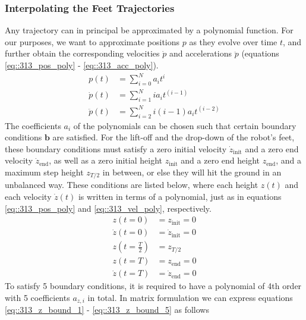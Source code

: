 \subsubsection{Interpolating the Feet Trajectories}
Any trajectory can in principal be approximated by a polynomial function. For our purposes, we want to approximate positions $p$ as they evolve over time $t$, and further obtain the corresponding velocities $\dot{p}$ and accelerations $\ddot{p}$ (equations \ref{eq::313_pos_poly} - \ref{eq::313_acc_poly}).  
\begin{align}
	p(t) &= \sum_{i = 0}^{N}a_it^i 
	\label{eq::313_pos_poly}\\
	\dot{p}(t) &= \sum_{i = 1}^{N}ia_it^{(i-1)} 
	\label{eq::313_vel_poly}\\
	\ddot{p}(t) &= \sum_{i = 2}^{N}i(i-1)a_it^{(i-2)}
	\label{eq::313_acc_poly}
\end{align}
The coefficients $a_i$ of the polynomials can be chosen such that certain boundary conditions $\bm{b}$ are satisfied. For the lift-off and the drop-down of the robot's feet, these boundary conditions must satisfy a zero initial velocity $\dot{z}_\text{init}$ and a zero end velocity $\dot{z}_\text{end}$, as well as a zero initial height $z_\text{init}$ and a zero end height $z_\text{end}$, and a maximum step height $z_{T/2}$ in between, or else they will hit the ground in an unbalanced way. These conditions are listed below, where each height $z(t)$ and each velocity $\dot{z}(t)$ is written in terms of a polynomial, just as in equations \ref{eq::313_pos_poly} and \ref{eq::313_vel_poly}, respectively. 
\begin{align}
	z(t = 0) &= z_\text{init} = 0
	\label{eq::313_z_bound_1} \\
	\dot{z}(t = 0) &= \dot{z}_\text{init} = 0 \\
	z(t = \frac{T}{2}) &= z_{T/2}\\  
	z(t = T) &= z_\text{end} = 0 \\
	\dot{z}(t = T) &= \dot{z}_\text{end} = 0 
	\label{eq::313_z_bound_5}
\end{align}
To satisfy 5 boundary conditions, it is required to have a polynomial of 4th order with 5 coefficients $a_{z,i}$ in total. In matrix formulation we can express equations \ref{eq::313_z_bound_1} - \ref{eq::313_z_bound_5} as follows
